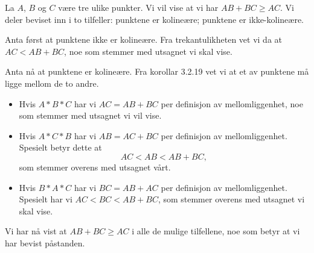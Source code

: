 \begin{oppgave}[4.3.4]
    La $A$, $B$ og $C$ være tre ulike punkter. 
    Vi vil vise at vi har $AB+BC\geq AC$.
    Vi deler beviset inn i to tilfeller: punktene er kolineære; punktene er ikke-kolineære. 

    Anta først at punktene ikke er kolineære. 
    Fra trekantulikheten vet vi da at $AC<AB+BC$, noe som stemmer med utsagnet vi skal vise. 

    Anta nå at punktene er kolineære. 
    Fra korollar 3.2.19 vet vi at et av punktene må ligge mellom de to andre.
    \begin{itemize}
        \item Hvis $A\ast B\ast C$ har vi $AC = AB+BC$ per definisjon av mellomliggenhet, noe som stemmer med utsagnet vi vil vise. 
        \item Hvis $A\ast C\ast B$ har vi $AB=AC+BC$ per definisjon av mellomliggenhet. Spesielt betyr dette at $$AC<AB<AB+BC,$$ som stemmer overens med utsagnet vårt. 
        \item Hvis $B\ast A\ast C$ har vi $BC=AB+AC$ per definisjon av mellomliggenhet. Spesielt har vi $AC<BC<AB+BC$, som stemmer overens med utsagnet vi skal vise. 
    \end{itemize}
    Vi har nå vist at $AB+BC\geq AC$ i alle de mulige tilfellene, noe som betyr at vi har bevist påstanden. 
\end{oppgave}


